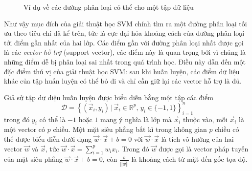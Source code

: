 \begin{figure}[ht]
\begin{subfigure}[b]{0.32\textwidth}
{
}
\end{subfigure}
\begin{subfigure}[b]{0.32\textwidth}
\centering
{}
\end{subfigure}
\caption{Ví dụ về các đường phân loại có thể cho một tập dữ liệu\label{sep-eg}}
\end{figure}

Như vậy mục đích của giải thuật học SVM chính tìm ra một đường phân loại tối ưu theo tiêu chí đã kể trên, tức là cực đại hóa khoảng cách của đường phân loại tới điểm gần nhất của hai lớp. Các điểm gần với đường phân loại nhất được gọi là các \emph{vector hỗ trợ} (support vector), các điểm này là quan trọng bởi vì chúng là những điểm dễ bị phân loại sai nhất trong quá trình học. Điều này dẫn đến một đặc điểm thú vị của giải thuật học SVM: sau khi huấn luyện, các điểm dữ liệu khác của tập huấn luyện có thể bỏ đi và chỉ cần giữ lại các vector hỗ trợ là đủ.

Giả sử tập dữ diệu huấn luyện được biểu diễn bằng một tập các điểm \[\mathcal{D}=\left\{(\vec{x}_i,y_i)\,|\,\vec{x}_i\in\mathbb{R}^p,\,y_i\in\{-1,1\}\right\}_{i=1}^{n}\] trong đó $y_i$ có thể là $-1$ hoặc $1$ mang ý nghĩa là lớp mà $\vec{x}_i$ thuộc vào, mỗi $\vec{x}_i$ là một vector có $p$ chiều. Một mặt siêu phẳng bất kì trong không gian $p$ chiều có thể được biểu diễn dưới dạng $\vec{w}\cdot\vec{x}+b=0$ với $\vec{w}\cdot\vec{x}$ là tích vô hướng của hai vector $\vec{w}$ và $\vec{x}$, tức $\vec{w}\cdot\vec{x}=\sum_{i=1}^{p}w_ix_i$. Trong đó $\vec{w}$ được gọi là vector pháp tuyến của mặt siêu phẳng $\vec{w}\cdot\vec{x}+b=0$, còn $\frac{b}{||\vec{w}||}$ là khoảng cách từ mặt đến gốc tọa độ.

